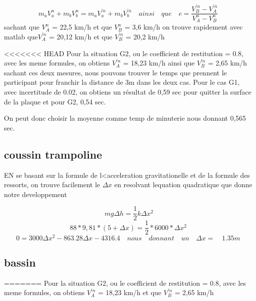 \documentclass{article}
\begin{document}
 \begin{equation}
 m_{a}V_{a}^{n} + m_{b}V_{b}^{n} = m_{a}V_{a}^{'n} + m_{b}V_{b}^{'n}  \quad ainsi \quad que \quad e = \frac {V_{B}^{'n}-V_{A}^{'n}}{V_{A}^{n}-V_{B}^{n}} 
 \end{equation}
 sachant que $ V_{A}^{n}$ = 22,5 km/h et que $V_{B}^{n}$ = 3,6 km/h on trouve rapidement avec matlab que$ V_{A}^{'n}$ = 20,12 km/h et que $V_{B}^{'n}$ = 20,2 km/h 
 
<<<<<<< HEAD
\vspace*{4mm}
 Pour la situation G2, ou le coefficient de restitution = 0.8, avec les meme formules, on obtiens $ V_{A}^{'n}$ = 18,23 km/h ainsi que $V_{B}^{'n}$ = 2,65 km/h  sachant ces deux mesures, nous pouvons trouver le temps que prennent le participant pour franchir la distance de 3m dans les deux cas. Pour le cas G1, avec incertitude de 0.02, on obtiens un résultat de 0,59 sec pour quitter la surface de la plaque et pour G2, 0,54 sec.
 
 \vspace*{4mm}
 
On peut donc choisir la moyenne comme temp de minuterie nous donnant 0,565 sec.
 
 
 \subsection{coussin trampoline}
 
 EN se basant sur la formule de l<acceleration gravitationelle et de la formule des ressorts, on trouve facilement le $\Delta x$ en resolvant lequation quadratique que donne notre developpement
 
 \begin{equation}
\ mg \Delta h = \frac{1}{2}k \Delta x ^2
 \end{equation}
 \begin{equation}
 88*9,81*(5+\Delta x) = \frac{1}{2}*6000*\Delta x^2 
 \end{equation}
 \begin{equation}
 0 = 3000\Delta x^2 - 863.28 \Delta x - 4316.4 \quad nous\quad  donnant\quad  un\quad  \Delta x=\quad 1.35m 
 \end{equation}

\subsection{bassin}
=======
\vspace*{7mm}
 Pour la situation G2, ou le coefficient de restitution = 0.8, avec les meme formules, on obtiens $ V_{A}^{'n}$ = 18,23 km/h et que $V_{B}^{'n}$ = 2,65 km/h 
 
\end{document}
